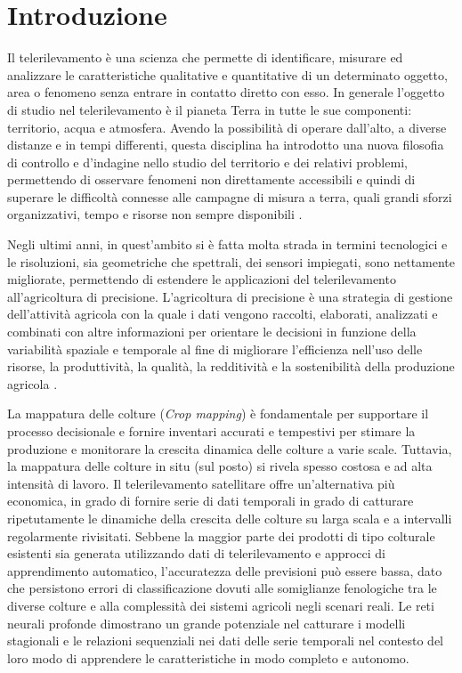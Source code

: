 \chapter*{Introduzione}

Il telerilevamento è una scienza che permette di identificare, misurare ed
analizzare le caratteristiche qualitative e quantitative di un determinato oggetto,
area o fenomeno senza entrare in contatto diretto con esso. In generale l’oggetto di
studio nel telerilevamento è il pianeta Terra in tutte le sue componenti: territorio,
acqua e atmosfera. Avendo la possibilità di operare dall'alto, a diverse distanze
e in tempi differenti, questa disciplina ha introdotto una nuova filosofia di
controllo e d’indagine nello studio del territorio e dei relativi problemi,
permettendo di osservare fenomeni non direttamente accessibili e quindi di
superare le difficoltà connesse alle campagne di misura a terra, quali grandi sforzi
organizzativi, tempo e risorse non sempre disponibili 
\cite{ALL4_REMOTE_SENSING, ALL5_REMOTE_SENSING,ALL6_REMOTE_SENSING}.

Negli ultimi anni, in quest’ambito si è fatta molta strada in termini tecnologici
e le risoluzioni, sia geometriche che spettrali, dei sensori impiegati, sono
nettamente migliorate, permettendo di estendere le applicazioni del
telerilevamento all’agricoltura di precisione. L'agricoltura di precisione è una strategia di 
gestione dell’attività agricola con la quale i dati vengono raccolti, 
elaborati, analizzati e combinati con altre informazioni per orientare le decisioni in 
funzione della variabilità spaziale e temporale al fine di migliorare l'efficienza 
nell'uso delle risorse, la produttività, la qualità, la redditività e la sostenibilità 
della produzione agricola \cite{Agricoltura_precisione}.

La mappatura delle colture (\textit{Crop mapping}) è fondamentale per supportare il 
processo decisionale e fornire inventari accurati e tempestivi per stimare la 
produzione e monitorare la crescita dinamica delle colture a varie scale. 
Tuttavia, la mappatura delle colture in situ (sul posto) si rivela spesso costosa e ad alta 
intensità di lavoro. Il telerilevamento satellitare offre un'alternativa più economica, 
in grado di fornire serie di dati temporali in grado di catturare ripetutamente le 
dinamiche della crescita delle colture su larga scala e a intervalli regolarmente 
rivisitati. Sebbene la maggior parte dei prodotti di tipo colturale esistenti sia 
generata utilizzando dati di telerilevamento e approcci di apprendimento automatico, 
l'accuratezza delle previsioni può essere bassa, dato che persistono errori di classificazione 
dovuti alle somiglianze fenologiche tra le diverse colture e alla complessità dei sistemi agricoli 
negli scenari reali. Le reti neurali profonde dimostrano un grande potenziale nel catturare i 
modelli stagionali e le relazioni sequenziali nei dati delle serie temporali nel contesto 
del loro modo di apprendere le caratteristiche in modo completo e autonomo. 

